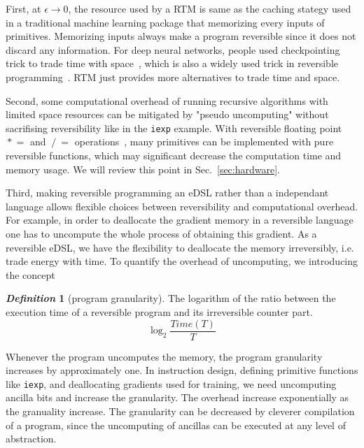 \documentclass[aps,twocolumn,longbibliography,english,superscriptaddress,prr]{revtex4-1}
\newcommand{\<}{\langle}
\renewcommand{\>}{\rangle}
\newcommand{\Sec}[1]{Sec.~\ref{#1}}
\theoremstyle{definition}\newtheorem{definition}{\textit{Definition}}
\begin{document}
First, at $\epsilon \rightarrow 0$, the resource used by a RTM is same as the caching stategy used in a traditional machine learning package that memorizing every inputs of primitives. Memorizing inputs always make a program reversible since it does not discard any information.
For deep neural networks, people used checkpointing trick to trade time with space~\cite{Chen2016}, which is also a widely used trick in reversible programming~\cite{Perumalla2013}. RTM just provides more alternatives to trade time and space.

Second, some computational overhead of running recursive algorithms with limited space resources can be mitigated by "pseudo uncomputing" without sacrifising reversibility like in the \texttt{iexp} example. With reversible floating point $\mathrel{*}=$ and $\mathrel{/}=$ operations~\cite{Hner2018}, many primitives can be implemented with pure reversible functions, which may significant decrease the computation time and memory usage. We will review this point in \Sec{sec:hardware}.

Third, making reversible programming an eDSL rather than a independant language allows flexible choices between reversibility and computational overhead. For example, in order to deallocate the gradient memory in a reversible language one has to uncompute the whole process of obtaining this gradient.
As a reversible eDSL, we have the flexibility to deallocate the memory irreversibly, i.e. trade energy with time. To quantify the overhead of uncomputing, we introducing the concept
\begin{definition}[program granularity]
    The logarithm of the ratio between the execution time of a reversible program and its irreversible counter part.
    \begin{equation}
        \log_2 \frac{Time(T)}{T}
    \end{equation}
\end{definition}
Whenever the program uncomputes the memory, the program granularity increases by approximately one. In instruction design, defining primitive functions like \texttt{iexp}, and deallocating gradients used for training, we need uncomputing ancilla bits and increase the granularity. The overhead increase exponentially as the granuality increase.
The granularity can be decreased by cleverer compilation of a program, since the uncomputing of ancillas can be executed at any level of abstraction.
\end{document}
